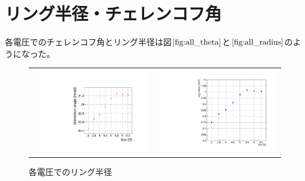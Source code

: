 \documentclass[uplatex, titlepage, dvipdfmx, 12pt, a4paper]{jsreport}
\begin{document}

  \section{リング半径・チェレンコフ角}
    各電圧でのチェレンコフ角とリング半径は図$\ref{fig:all_theta}$と$\ref{fig:all_radius}$のようになった。
    \begin{figure}[hbtp]
      \begin{tabular}{cc}
        \begin{minipage}[t]{0.45\hsize}
          \centering
          \includegraphics[scale=0.4, clip]{image/theta_allV.pdf}
          \caption{各電圧でのチェレンコフ角} 
          \label{fig:all_theta} 
        \end{minipage} &
        \begin{minipage}[t]{0.45\hsize}
          \centering
          \includegraphics[scale=0.3, clip]{image/all_radius.pdf}
          \caption{各電圧でのリング半径} 
          \label{fig:all_radius} 
        \end{minipage}
      \end{tabular}
    \end{figure}
\end{document}
